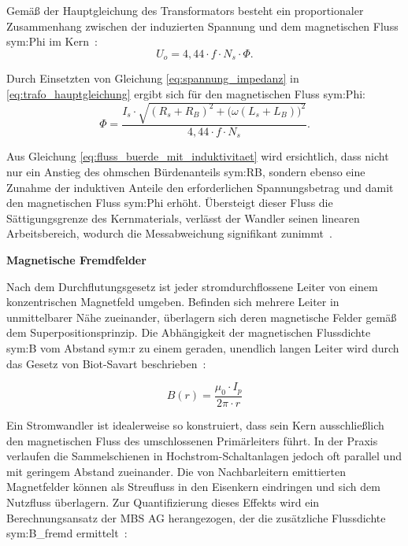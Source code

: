 Gemäß der Hauptgleichung des Transformators besteht ein proportionaler Zusammenhang zwischen der induzierten Spannung und dem magnetischen Fluss \gls{sym:Phi} im Kern~\cite[S.~67]{book-Technologie_Messwandler-Minkner}:
\begin{equation}
    U_o = 4{,}44 \cdot f \cdot N_s \cdot \Phi.
    \label{eq:trafo_hauptgleichung}
\end{equation}

Durch Einsetzten von Gleichung \eqref{eq:spannung_impedanz} in \eqref{eq:trafo_hauptgleichung} ergibt sich für den magnetischen Fluss \gls{sym:Phi}:
\begin{equation}
    \Phi
    = \frac{I_s \cdot \sqrt{(R_s+R_B)^2 + \bigl(\omega(L_s+L_B)\bigr)^2}}
    {4{,}44 \cdot f \cdot N_s}.
    \label{eq:fluss_buerde_mit_induktivitaet}
\end{equation}

Aus Gleichung \eqref{eq:fluss_buerde_mit_induktivitaet} wird ersichtlich, dass nicht nur ein Anstieg des ohmschen Bürdenanteils \gls{sym:RB}, sondern ebenso eine Zunahme der induktiven Anteile den erforderlichen Spannungsbetrag und damit den magnetischen Fluss \gls{sym:Phi} erhöht. Übersteigt dieser Fluss die Sättigungsgrenze des Kernmaterials, verlässt der Wandler seinen linearen Arbeitsbereich, wodurch die Messabweichung signifikant zunimmt~\cite[S.~67, S.~73]{book-Technologie_Messwandler-Minkner}.


\pagebreak[1]
\medskip
\noindent\textbf{Magnetische Fremdfelder}\par
\label{sec:theorie_fremdfelder}

Nach dem Durchflutungsgesetz ist jeder stromdurchflossene Leiter von einem konzentrischen Magnetfeld umgeben. Befinden sich mehrere Leiter in unmittelbarer Nähe zueinander, überlagern sich deren magnetische Felder gemäß dem Superpositionsprinzip. Die Abhängigkeit der magnetischen Flussdichte \gls{sym:B} vom Abstand \gls{sym:r} zu einem geraden, unendlich langen Leiter wird durch das Gesetz von Biot-Savart beschrieben~\cite[S.~343]{book-Kuepfmueller_Theo_ETechnik-Mathis}\cite[Kap.~4.5.4]{book-Physik_Ingenieure-Hering}\cite[S.~333]{book-Kuepfmueller_Theo_ETechnik-Mathis}:

\begin{equation}
    B(r) = \frac{\mu_0 \cdot I_p}{2 \pi \cdot r}
    \label{equ:biot_savart}
\end{equation}

Ein Stromwandler ist idealerweise so konstruiert, dass sein Kern ausschließlich den magnetischen Fluss des umschlossenen Primärleiters führt. In der Praxis verlaufen die Sammelschienen in Hochstrom-Schaltanlagen jedoch oft parallel und mit geringem Abstand zueinander. Die von Nachbarleitern emittierten Magnetfelder können als Streufluss in den Eisenkern eindringen und sich dem Nutzfluss überlagern. Zur Quantifizierung dieses Effekts wird ein Berechnungsansatz der MBS AG herangezogen, der die zusätzliche Flussdichte \gls{sym:B_fremd} ermittelt~\cite[S.~75]{book-Technologie_Messwandler-Minkner}\cite{pdf-Accuracy_Current_Transformers-Pfuntner}\cite{website-Fremdfeldkompensierte_Wandler-MBS}:

